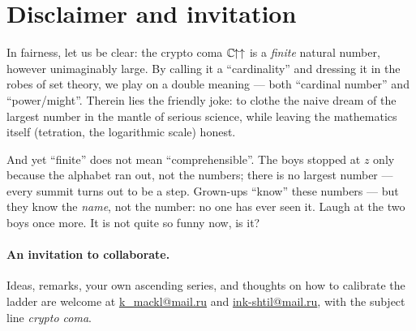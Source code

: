 \section{Disclaimer and invitation}
\label{sec:disclaimer}

In fairness, let us be clear: the crypto coma \(\mathbb{C}\mkern-1.5mu{\uparrow\uparrow}\) is a \emph{finite} natural number,
however unimaginably large. By calling it a ``cardinality'' and dressing it in the robes of
set theory, we play on a double meaning --- both ``cardinal number'' and ``power/might''.
Therein lies the friendly joke: to clothe the naive dream of the largest number in the
mantle of serious science, while leaving the mathematics itself (tetration, the logarithmic
scale) honest.

And yet ``finite'' does not mean ``comprehensible''. The boys stopped at \(z\) only because
the alphabet ran out, not the numbers; there is no largest number --- every summit turns out
to be a step. Grown-ups ``know'' these numbers --- but they know the \emph{name}, not the
number: no one has ever seen it. Laugh at the two boys once more. It is not quite so funny
now, is it?

\paragraph{An invitation to collaborate.} Ideas, remarks, your own ascending series, and thoughts on how
to calibrate the ladder are welcome at \href{mailto:k_mackl@mail.ru?subject=crypto\%20coma}{k\_mackl@mail.ru} and
\href{mailto:ink-shtil@mail.ru?subject=crypto\%20coma}{ink-shtil@mail.ru}, with the subject
line \emph{crypto coma}.
